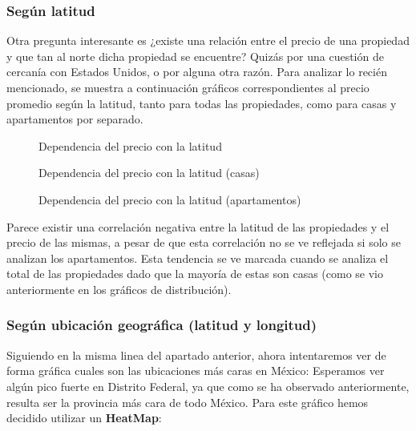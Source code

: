 \documentclass[
10pt, %
a4paper, %
oneside, %
headinclude,footinclude, %
BCOR5mm, %
]{scrartcl}
\begin{document}
\subsubsection{Seg\'un latitud}
    Otra pregunta interesante es ¿existe una relación entre el precio de una propiedad y que tan al norte dicha propiedad se encuentre? Quizás por una cuestión de cercanía con Estados Unidos, o por alguna otra razón. Para analizar lo recién mencionado, se muestra a continuación gráficos correspondientes al precio promedio según la latitud, tanto para todas las propiedades, como para casas y apartamentos por separado.
    
    \begin{figure}[H]
        \caption{Dependencia del precio con la latitud}
        \label{fig:precio-latitud-todas}
    \end{figure}
    
    \begin{figure}[H]
        \caption{Dependencia del precio con la latitud (casas)}
        \label{fig:precio-latitud-casas}
    \end{figure}
    
    \begin{figure}[H]
        \caption{Dependencia del precio con la latitud (apartamentos)}
        \label{fig:precio-latitud-apartamentos}
    \end{figure}

    Parece existir una correlación negativa entre la latitud de las propiedades y el precio de las mismas, a pesar de que esta correlación no se ve reflejada si solo se analizan los apartamentos. Esta tendencia se ve marcada cuando se analiza el total de las propiedades dado que la mayoría de estas son casas (como se vio anteriormente en los gráficos de distribución).


\subsubsection{Según ubicaci\'on geogr\'afica (latitud y longitud)}
    Siguiendo en la misma linea del apartado anterior, ahora intentaremos ver de forma gr\'afica cuales son las ubicaciones m\'as caras en M\'exico: Esperamos ver alg\'un pico fuerte en Distrito Federal, ya que como se ha observado anteriormente, resulta ser la provincia m\'as cara de todo M\'exico.
    \vskip 2mm
    Para este gr\'afico hemos decidido utilizar un \textbf{HeatMap}:
\end{document}
